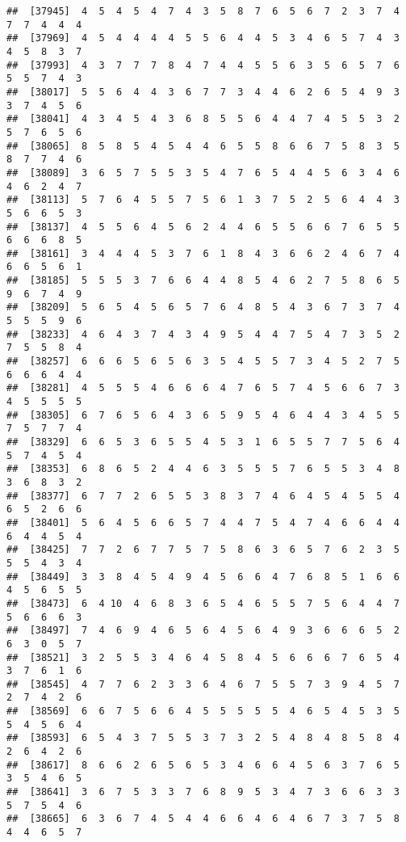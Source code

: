 \documentclass[
]{book}
\begin{document}
\begin{verbatim}
##  [37945]  4  5  4  5  4  7  4  3  5  8  7  6  5  6  7  2  3  7  4  7  7  4  4  4
##  [37969]  4  5  4  4  4  4  5  5  6  4  4  5  3  4  6  5  7  4  3  4  5  8  3  7
##  [37993]  4  3  7  7  7  8  4  7  4  4  5  5  6  3  5  6  5  7  6  5  5  7  4  3
##  [38017]  5  5  6  4  4  3  6  7  7  3  4  4  6  2  6  5  4  9  3  3  7  4  5  6
##  [38041]  4  3  4  5  4  3  6  8  5  5  6  4  4  7  4  5  5  3  2  5  7  6  5  6
##  [38065]  8  5  8  5  4  5  4  4  6  5  5  8  6  6  7  5  8  3  5  8  7  7  4  6
##  [38089]  3  6  5  7  5  5  3  5  4  7  6  5  4  4  5  6  3  4  6  4  6  2  4  7
##  [38113]  5  7  6  4  5  5  7  5  6  1  3  7  5  2  5  6  4  4  3  5  6  6  5  3
##  [38137]  4  5  5  6  4  5  6  2  4  4  6  5  5  6  6  7  6  5  5  6  6  6  8  5
##  [38161]  3  4  4  4  5  3  7  6  1  8  4  3  6  6  2  4  6  7  4  6  6  5  6  1
##  [38185]  5  5  5  3  7  6  6  4  4  8  5  4  6  2  7  5  8  6  5  9  6  7  4  9
##  [38209]  5  6  5  4  5  6  5  7  6  4  8  5  4  3  6  7  3  7  4  5  5  5  9  6
##  [38233]  4  6  4  3  7  4  3  4  9  5  4  4  7  5  4  7  3  5  2  7  5  5  8  4
##  [38257]  6  6  6  5  6  5  6  3  5  4  5  5  7  3  4  5  2  7  5  6  6  6  4  4
##  [38281]  4  5  5  5  4  6  6  6  4  7  6  5  7  4  5  6  6  7  3  4  5  5  5  5
##  [38305]  6  7  6  5  6  4  3  6  5  9  5  4  6  4  4  3  4  5  5  7  5  7  7  4
##  [38329]  6  6  5  3  6  5  5  4  5  3  1  6  5  5  7  7  5  6  4  5  7  4  5  4
##  [38353]  6  8  6  5  2  4  4  6  3  5  5  5  7  6  5  5  3  4  8  3  6  8  3  2
##  [38377]  6  7  7  2  6  5  5  3  8  3  7  4  6  4  5  4  5  5  4  6  5  2  6  6
##  [38401]  5  6  4  5  6  6  5  7  4  4  7  5  4  7  4  6  6  4  4  6  4  4  5  4
##  [38425]  7  7  2  6  7  7  5  7  5  8  6  3  6  5  7  6  2  3  5  5  5  4  3  4
##  [38449]  3  3  8  4  5  4  9  4  5  6  6  4  7  6  8  5  1  6  6  4  5  6  5  5
##  [38473]  6  4 10  4  6  8  3  6  5  4  6  5  5  7  5  6  4  4  7  5  6  6  6  3
##  [38497]  7  4  6  9  4  6  5  6  4  5  6  4  9  3  6  6  6  5  2  6  3  0  5  7
##  [38521]  3  2  5  5  3  4  6  4  5  8  4  5  6  6  6  7  6  5  4  3  7  6  1  6
##  [38545]  4  7  7  6  2  3  3  6  4  6  7  5  5  7  3  9  4  5  7  2  7  4  2  6
##  [38569]  6  6  7  5  6  6  4  5  5  5  5  5  4  6  5  4  5  3  5  5  4  5  6  4
##  [38593]  6  5  4  3  7  5  5  3  7  3  2  5  4  8  4  8  5  8  4  2  6  4  2  6
##  [38617]  8  6  6  2  6  5  6  5  3  4  6  6  4  5  6  3  7  6  5  3  5  4  6  5
##  [38641]  3  6  7  5  3  3  7  6  8  9  5  3  4  7  3  6  6  3  3  5  7  5  4  6
##  [38665]  6  3  6  7  4  5  4  4  6  6  4  6  4  6  7  3  7  5  8  4  4  6  5  7

\end{verbatim}
\end{document}
